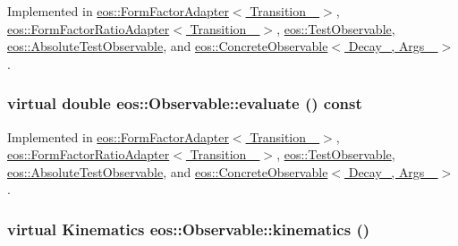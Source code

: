 Implemented in \hyperlink{classeos_1_1FormFactorAdapter_a85c062dbc8dd32bb25299fbab92110f5}{eos::FormFactorAdapter$<$ Transition\_\- $>$}, \hyperlink{classeos_1_1FormFactorRatioAdapter_ab5c4a8094db5ac8fc3860afc4a4087b0}{eos::FormFactorRatioAdapter$<$ Transition\_\- $>$}, \hyperlink{structeos_1_1TestObservable_a2ec70cb32b39215b3c3eafd05a94e1f6}{eos::TestObservable}, \hyperlink{structeos_1_1AbsoluteTestObservable_ac509cca6dca7383653b2d0e5c387db07}{eos::AbsoluteTestObservable}, and \hyperlink{classeos_1_1ConcreteObservable_af84f6c7410ff512dc8edb36f4501e389}{eos::ConcreteObservable$<$ Decay\_\-, Args\_\- $>$}.\hypertarget{classeos_1_1Observable_a913385d3a077d578bbcc2d502e5fdc2d}{
\subsubsection[{evaluate}]{\setlength{\rightskip}{0pt plus 5cm}virtual double eos::Observable::evaluate () const}}
\label{classeos_1_1Observable_a913385d3a077d578bbcc2d502e5fdc2d}


Implemented in \hyperlink{classeos_1_1FormFactorAdapter_ad14dd267ae5fcbe9b739d438904ce959}{eos::FormFactorAdapter$<$ Transition\_\- $>$}, \hyperlink{classeos_1_1FormFactorRatioAdapter_af0bed5942d9ba4b3c65788e1e05eaf8c}{eos::FormFactorRatioAdapter$<$ Transition\_\- $>$}, \hyperlink{structeos_1_1TestObservable_a05f143463bc9a2cddec1ee2bdb8d5ba2}{eos::TestObservable}, \hyperlink{structeos_1_1AbsoluteTestObservable_a47742fbfae1d0d8b57c09ee2a7501376}{eos::AbsoluteTestObservable}, and \hyperlink{classeos_1_1ConcreteObservable_a4127e180162b8f5eeebd55e7c8d1b7cf}{eos::ConcreteObservable$<$ Decay\_\-, Args\_\- $>$}.\hypertarget{classeos_1_1Observable_a8bfd8cc2873e467ac9ae100d029d8c49}{
\subsubsection[{kinematics}]{\setlength{\rightskip}{0pt plus 5cm}virtual {\bf Kinematics} eos::Observable::kinematics ()}}
\label{classeos_1_1Observable_a8bfd8cc2873e467ac9ae100d029d8c49}


